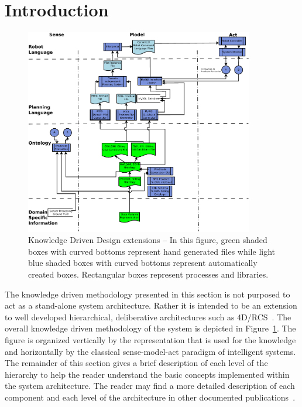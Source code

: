 \section{Introduction}

\begin{figure}[!t!h!b!]
\centering
\includegraphics[width=10cm]{Figure/KnowledgeDrivenRobotics.pdf}
\caption{Knowledge Driven Design extensions -- In this figure, green shaded
  boxes with curved bottoms represent hand generated files while light blue
  shaded boxes with curved bottoms represent automatically created boxes.
  Rectangular boxes represent processes and libraries. }
\label{fig:methodology}
\end{figure}
The knowledge driven methodology presented in this section is not purposed
to act as a stand-alone system architecture. Rather it is intended to be an
extension to well developed hierarchical, deliberative architectures such
as 4D/RCS~\cite{Albus2000}. The overall knowledge driven methodology of the
system is depicted in Figure~\ref{fig:methodology}. The figure is organized
vertically by the representation that is used for the knowledge and
horizontally by the classical sense-model-act paradigm of intelligent
systems. The remainder of this section gives a brief description of each
level of the hierarchy to help the reader understand the basic concepts
implemented within the system architecture. The reader may find a more
detailed description of each component and each level of the architecture
in other documented
publications~\cite{NISTIR.Balakirsky,BALAKIRSKY.IROS.2012}.
